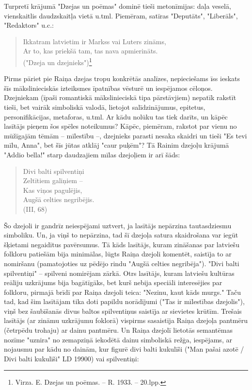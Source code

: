 \documentclass[11pt]{article}
\begin{document}
Turpretī krājumā "Dzejas un poēmas" dominē tieši
metonīmijas: daļa veselā, vienskaitlis daudzskaitļa vietā
u.tml. Piemēram, satīras "Deputāts", "Liberāls",
"Redaktors" u.c.:

\begin{quote}
Ikkatram latvietim ir Markss vai Luters zināms,\\
Ar to, kas priekšā tam, tas nava apmierināts.\\
("Dzeja un dzejnieks")\footnote{Virza. E.
Dzejas un poēmas. -- R. 1933. -- 20.lpp.}
\end{quote}

{\color{red}
Pirms pāriet pie Raiņa dzejas tropu konkrētās analīzes,
nepieciešams īss ieskats šīs mākslinieciskās izteiksmes
īpatnības vēsturē un iespējamos cēloņos.
Dzejniekam (īpaši romantiskā mākslinieciskā tipa pārstāvjiem)
nepatīk rakstīt tieši, bet vairāk simboliskā valodā,
lietojot salīdzinājumus, epitetus, personifikācijas,
metaforas, u.tml. } Ar kādu nolūku tas tiek darīts,
un kāpēc lasītājs pieņem šos spēles noteikumus?
Kāpēc, piemēram, rakstot par vienu no mūžīgajām tēmām --
mīlestību --, dzejnieks parasti nesaka skaidri un tieši
"Es tevi mīlu, Anna", bet šīs jūtas atklāj "caur puķēm"?
Tā Rainim dzejoļu krājumā "Addio bella!" starp daudzajiem
mīlas dzejoļiem ir arī šāds:

\begin{quote}
Divi balti spilventiņi\\
Zeltītiem galiņiem --\\
Kas viņos pagulējis,\\
Augšā celties negribējis.\\
(III, 68)
\end{quote}

Šo dzejoli ir gandrīz neiespējami uztvert, ja lasītājs
nepārzina tautasdziesmu simboliku. Un, ja viņš to
nepārzina, tad šī dzejoļa satura skaidrošana var iegūt
šķietami negaidītus pavērsumus. Tā kāds lasītājs,
kuram zināšanas par latviešu folkloru patiešām bija
minimālas, lūgts Raiņa dzejoli komentēt, saistīja to ar
nomiršanu (pamatojoties uz pēdējo rindu
"Augšā celties negribēja"). "Divi balti spilventiņi" --
spilveni nomirējam zārkā. Otrs lasītājs, kuram latviešu
kultūras reāliju uzkrājums bija bagātīgāks, bet kurš
nebija speciāli interesējies par folkloru, pirmajā
brīdī par Raiņa dzejoli teica: "Nezinu, kaut kāds murgs."
Taču tad, kad šim lasītājam tika doti papildu
norādījumi ("Tas ir mīlestības dzejolis"),
viņš bez šaubīšanās divus baltos spilventiņus saistīja
ar sievietes krūtīm.
Trešais lasītājs (ar zināmu uzkrājumu foklorā)
vispirms sasaistīja Raiņa dzejoļa pantmēru
(četrpēdu trohaju) ar dainu pantmēru. Un Raiņa dzejolī
lietotās semantēmas nozīme "uznira" no zemapziņā
iekodētā dainu simboliskā režģa, iespējams, ar
nojausmu par kādu no dainām, kur figurē divi balti
kukulīši ("Man pašai azotē / Divi balti kukulīši"
LD 19900) vai spilventiņi:
\end{document}
